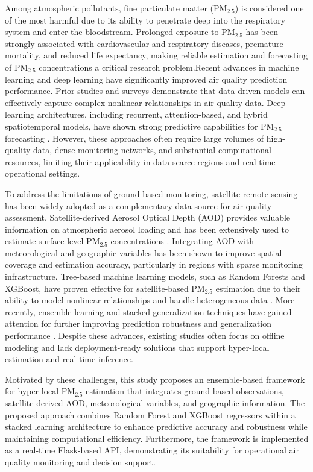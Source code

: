 \documentclass[conference]{IEEEtran}
\begin{document}
Among atmospheric pollutants, fine particulate matter (PM$_{2.5}$) is considered one of the most harmful due to its ability to penetrate deep into the respiratory system and enter the bloodstream. Prolonged exposure to PM$_{2.5}$ has been strongly associated with cardiovascular and respiratory diseases, premature mortality, and reduced life expectancy, making reliable estimation and forecasting of PM$_{2.5}$ concentrations a critical research problem.Recent advances in machine learning and deep learning have significantly improved air quality prediction performance. Prior studies and surveys \cite{b1,b2} demonstrate that data-driven models can effectively capture complex nonlinear relationships in air quality data. Deep learning architectures, including recurrent, attention-based, and hybrid spatiotemporal models, have shown strong predictive capabilities for PM$_{2.5}$ forecasting \cite{b3,b4,b5,b6,b7,b8}. However, these approaches often require large volumes of high-quality data, dense monitoring networks, and substantial computational resources, limiting their applicability in data-scarce regions and real-time operational settings.

To address the limitations of ground-based monitoring, satellite remote sensing has been widely adopted as a complementary data source for air quality assessment. Satellite-derived Aerosol Optical Depth (AOD) provides valuable information on atmospheric aerosol loading and has been extensively used to estimate surface-level PM$_{2.5}$ concentrations \cite{b9,b10}. Integrating AOD with meteorological and geographic variables has been shown to improve spatial coverage and estimation accuracy, particularly in regions with sparse monitoring infrastructure.
Tree-based machine learning models, such as Random Forests and XGBoost, have proven effective for satellite-based PM$_{2.5}$ estimation due to their ability to model nonlinear relationships and handle heterogeneous data \cite{b11,b12,b13}. More recently, ensemble learning and stacked generalization techniques have gained attention for further improving prediction robustness and generalization performance \cite{b14,b15}. Despite these advances, existing studies often focus on offline modeling and lack deployment-ready solutions that support hyper-local estimation and real-time inference.

Motivated by these challenges, this study proposes an ensemble-based framework for hyper-local PM$_{2.5}$ estimation that integrates ground-based observations, satellite-derived AOD, meteorological variables, and geographic information. The proposed approach combines Random Forest and XGBoost regressors within a stacked learning architecture to enhance predictive accuracy and robustness while maintaining computational efficiency. Furthermore, the framework is implemented as a real-time Flask-based API, demonstrating its suitability for operational air quality monitoring and decision support.
\end{document}

